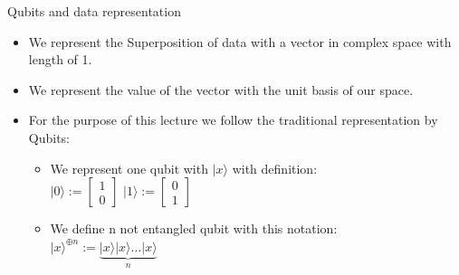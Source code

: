     \begin{frame}{Qubits and data representation}
        \begin{itemize}
            \item We represent the Superposition of data with a vector in complex space with length of 1.
            \item We represent the value of the vector with the unit basis of our space.
            \item For the purpose of this lecture we follow the traditional representation by Qubits:
                \begin{itemize}
                    \item We represent one qubit with $|x\rangle $ with definition:\\
                    $|0\rangle := \begin{bmatrix}
                        1\\
                        0
                    \end{bmatrix}$
                    $|1\rangle := \begin{bmatrix}
                        0\\
                        1
                    \end{bmatrix}$
                    \item We define n not \alert{entangled} qubit with this notation:\\
                    $|x\rangle^{\oplus n} := \underbrace{|x\rangle|x\rangle \dots |x\rangle}_n $
                \end{itemize}
        \end{itemize}
    \end{frame}
